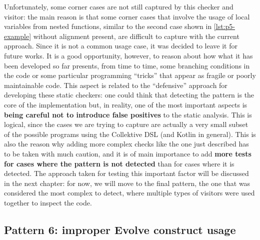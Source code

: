 \documentclass[12pt,a4paper,openright,twoside]{book}
\begin{document}
Unfortunately, some corner cases are not still captured by this checker and
visitor: the main reason is that some corner cases that involve the usage of
local variables from nested functions, similar to the second case shown in
\cref{lst:p5-example} without alignment present, are difficult to capture with
the current approach. Since it is not a common usage case, it was decided to
leave it for future works. It is a good opportunity, however, to reason about
how what it has been developed so far presents, from time to time, some
branching conditions in the code or some particular programming ``tricks'' that
appear as fragile or poorly maintainable code. 
%
This aspect is related to the ``defensive'' approach for developing these static
checkers: one could think that detecting the pattern is the core of the
implementation but, in reality, one of the most important aspects is
\textbf{being careful not to introduce false
positives}\cite{DBLP:journals/jss/LenarduzziPSLP23} to the static analysis.
%
This is logical, since the cases we are trying to capture are actually a very
small subset of the possible programs using the Collektive DSL (and Kotlin in
general). This is also the reason why adding more complex checks like the one
just described has to be taken with much caution, and it is of main importance
to add \textbf{more tests for cases where the pattern is not detected} than for
cases where it is detected.
%
The approach taken for testing this important factor will be discussed in the
next chapter: for now, we will move to the final pattern, the one that was
considered the most complex to detect, where multiple types of visitors were
used together to inspect the code.


 
\subsection{Pattern 6: improper Evolve construct usage}
\end{document}
